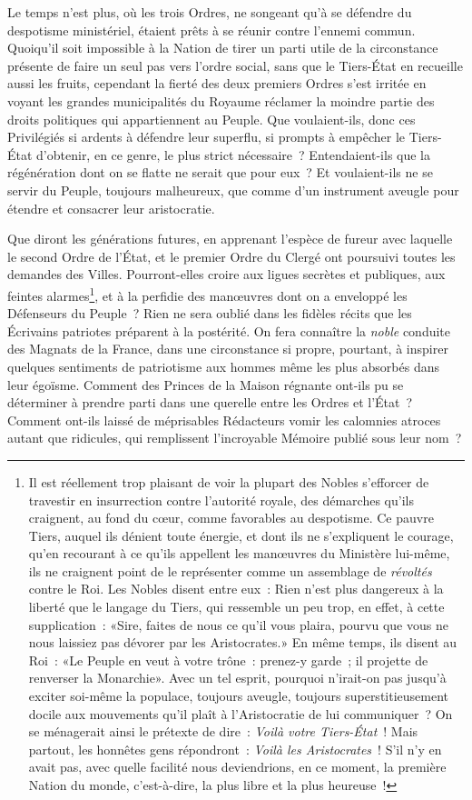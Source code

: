 \documentclass[french,twoside]{book} %
\newcommand\chaptercont{} %
\begin{document}
\chaptercont
\noindent Le temps n’est plus, où les trois Ordres, ne songeant qu’à se défendre du despotisme ministériel, étaient prêts à se réunir contre l’ennemi commun. Quoiqu’il soit impossible à la Nation de tirer un parti utile de la circonstance présente de faire un seul pas vers l’ordre social, sans que le Tiers-État en recueille aussi les fruits, cependant la fierté des deux premiers Ordres s’est irritée en voyant les grandes municipalités du Royaume réclamer la moindre partie des droits politiques qui appartiennent au Peuple. Que voulaient-ils, donc ces Privilégiés si ardents à défendre leur superflu, si prompts à empêcher le Tiers-État d’obtenir, en ce genre, le plus strict nécessaire ? Entendaient-ils que la régénération dont on se flatte ne serait que pour eux ? Et voulaient-ils ne se servir du Peuple, toujours malheureux, que comme d’un instrument aveugle pour étendre et consacrer leur aristocratie.\par
Que diront les générations futures, en apprenant l’espèce de fureur avec laquelle le second Ordre de l’État, et le premier Ordre du Clergé ont poursuivi toutes les demandes des Villes. Pourront-elles croire aux ligues secrètes et publiques, aux feintes alarmes\footnote{Il est réellement trop plaisant de voir la plupart des Nobles s’efforcer de travestir en insurrection contre l’autorité royale, des démarches qu’ils craignent, au fond du cœur, comme favorables au despotisme. Ce pauvre Tiers, auquel ils dénient toute énergie, et dont ils ne s’expliquent le courage, qu’en recourant à ce qu’ils appellent les manœuvres du Ministère lui-même, ils ne craignent point de le représenter comme un assemblage de {\itshape révoltés} contre le Roi. Les Nobles disent entre eux : Rien n’est plus dangereux à la liberté que le langage du Tiers, qui ressemble un peu trop, en effet, à cette supplication : «Sire, faites de nous ce qu’il vous plaira, pourvu que vous ne nous laissiez pas dévorer par les Aristocrates.» En même temps, ils disent au Roi : «Le Peuple en veut à votre trône : prenez-y garde ; il projette de renverser la Monarchie». Avec un tel esprit, pourquoi n’irait-on pas jusqu’à exciter soi-même la populace, toujours aveugle, toujours superstitieusement docile aux mouvements qu’il plaît à l’Aristocratie de lui communiquer ? On se ménagerait ainsi le prétexte de dire : {\itshape Voilà votre Tiers-État} ! Mais partout, les honnêtes gens répondront : {\itshape Voilà les Aristocrates} ! S’il n’y en avait pas, avec quelle facilité nous deviendrions, en ce moment, la première Nation du monde, c’est-à-dire, la plus libre et la plus heureuse !}, et à la perfidie des manœuvres dont on a enveloppé les Défenseurs du Peuple ? Rien ne sera oublié dans les fidèles récits que les Écrivains patriotes préparent à la postérité. On fera connaître la {\itshape noble} conduite des Magnats de la France, dans une circonstance si propre, pourtant, à inspirer quelques sentiments de patriotisme aux hommes même les plus absorbés dans leur égoïsme. Comment des Princes de la Maison régnante ont-ils pu se déterminer à prendre parti dans une querelle entre les Ordres et l’État ? Comment ont-ils laissé de méprisables Rédacteurs vomir les calomnies atroces autant que ridicules, qui remplissent l’incroyable Mémoire publié sous leur nom ?\par
\end{document}
